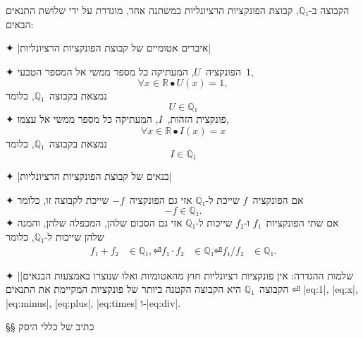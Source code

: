 \label{definition:rationals}
הקבוצה ב-$ℚ₁$, קבוצת הפונקציות הרציונליות במשתנה אחד, מוגדרת על ידי שלושת
התנאים הבאים:
\begin{enumerate}
  ✦ \ע|איברים אטומיים של קבוצת הפונקציות הרציונליות|
  \begin{itemize}
    ✦ הפונקציה~$U$, המעתיקה כל מספר ממשי אל המספר הטבעי~$1$,
    \begin{equation*}
      ∀ x∈ℝ∙ U(x)=1,
    \end{equation*}
    נמצאת בקבוצה~$ℚ₁$,
    כלומר
    \begin{equation}\label{eq:1}
      U∈ℚ₁
    \end{equation}
    ✦ פונקצית הזהות,~$I$, המעתיקה כל מספר ממשי אל עצמו,
    \begin{equation*}
      ∀ x∈ℝ∙ I(x)=x
    \end{equation*}
    נמצאת בקבוצה~$ℚ₁$, כלומר
    \begin{equation}\label{eq:x}
      I∈ℚ₁
    \end{equation}
  \end{itemize}
  ✦ \ע|בנאים של קבוצת הפונקציות הרציונליות|
  \begin{itemize}
    ✦ אם הפונקציה~$f$ שייכת ל-$ℚ₁$ אזי גם הפונקציה~$-f$ שייכת לקבוצה זו, כלומר
    \begin{equation}\label{eq:minus}
-f∈ℚ₁.
    \end{equation}
    ✦ אם שתי הפונקציות~$f₁$ ו-$f₂$ שייכות ל-$ℚ₁$ אזי גם הסכום שלהן, המכפלה
    שלהן, והמנה שלהן שייכות ל-$ℚ₁$, כלומר
    \begin{align}
      f₁+f₂ &∈ℚ₁, \label{eq:plus} ⏎
      f₁·f₂ &∈ℚ₁ \label{eq:times} ⏎
      f₁/f₂ &∈ℚ₁. \label{eq:div}
    \end{align}
  \end{itemize}
  ✦ \ע|שלמות ההגדרה: אין פונקציות רציונליות חוץ מהאטומיות ואלו שנוצרו באמצעות
  הבנאים| ⏎
  הקבוצה~$ℚ₁$ היא הקבוצה הקטנה ביותר של פונקציות המקיימת את התנאים
  |eq:1|,
  |eq:x|,
  |eq:minus|,
  |eq:plus|,
  |eq:times|
  ו-|eq:div|.
\end{enumerate}

§§ כתיב של כללי היסק

